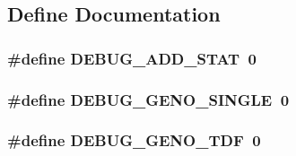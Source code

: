 \subsection{Define Documentation}
\hypertarget{genostats_8hh_a37acf130446eb5259a580d6698ab64ab}{
\subsubsection[{DEBUG\_\-ADD\_\-STAT}]{\setlength{\rightskip}{0pt plus 5cm}\#define DEBUG\_\-ADD\_\-STAT~0}}
\label{genostats_8hh_a37acf130446eb5259a580d6698ab64ab}
\hypertarget{genostats_8hh_aa2d894fba69489f0ab980c1e3b75d87e}{
\subsubsection[{DEBUG\_\-GENO\_\-SINGLE}]{\setlength{\rightskip}{0pt plus 5cm}\#define DEBUG\_\-GENO\_\-SINGLE~0}}
\label{genostats_8hh_aa2d894fba69489f0ab980c1e3b75d87e}
\hypertarget{genostats_8hh_a752e1ca60a4f4f81676221efeb1cc895}{
\subsubsection[{DEBUG\_\-GENO\_\-TDF}]{\setlength{\rightskip}{0pt plus 5cm}\#define DEBUG\_\-GENO\_\-TDF~0}}
\label{genostats_8hh_a752e1ca60a4f4f81676221efeb1cc895}
